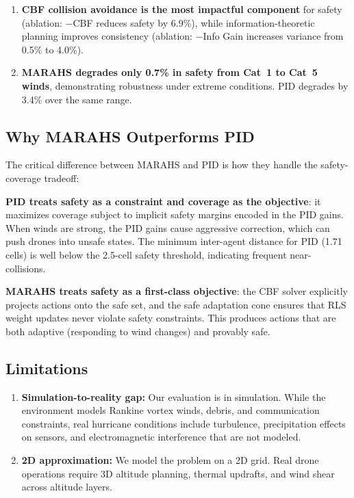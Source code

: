 \documentclass[12pt,a4paper,twocolumn]{article}
\begin{document}
\begin{enumerate}[leftmargin=*]
\begin{enumerate}[leftmargin=*]
    \item \textbf{CBF collision avoidance is the most impactful component} for safety (ablation: $-$CBF reduces safety by 6.9\%), while information-theoretic planning improves consistency (ablation: $-$Info Gain increases variance from 0.5\% to 4.0\%).

    \item \textbf{MARAHS degrades only 0.7\% in safety from Cat~1 to Cat~5 winds}, demonstrating robustness under extreme conditions. PID degrades by 3.4\% over the same range.
\end{enumerate}

\subsection{Why MARAHS Outperforms PID}
\label{sec:why_better}

The critical difference between MARAHS and PID is how they handle the safety-coverage tradeoff:

\textbf{PID treats safety as a constraint and coverage as the objective}: it maximizes coverage subject to implicit safety margins encoded in the PID gains. When winds are strong, the PID gains cause aggressive correction, which can push drones into unsafe states. The minimum inter-agent distance for PID (1.71 cells) is well below the 2.5-cell safety threshold, indicating frequent near-collisions.

\textbf{MARAHS treats safety as a first-class objective}: the CBF solver explicitly projects actions onto the safe set, and the safe adaptation cone ensures that RLS weight updates never violate safety constraints. This produces actions that are both adaptive (responding to wind changes) and provably safe.

\subsection{Limitations}
\label{sec:limitations}

\begin{enumerate}[leftmargin=*]
    \item \textbf{Simulation-to-reality gap:} Our evaluation is in simulation. While the environment models Rankine vortex winds, debris, and communication constraints, real hurricane conditions include turbulence, precipitation effects on sensors, and electromagnetic interference that are not modeled.

    \item \textbf{2D approximation:} We model the problem on a 2D grid. Real drone operations require 3D altitude planning, thermal updrafts, and wind shear across altitude layers.


\end{enumerate}
\end{enumerate}
\end{document}
